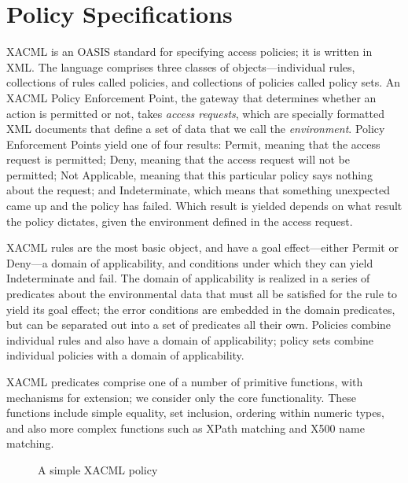 \section{Policy Specifications}
\label{sec:policy-spec}

XACML is an OASIS standard for specifying access policies; it is
written in XML.  The language comprises three classes of
objects---individual rules, collections of rules called policies, and
collections of policies called policy sets.  An XACML Policy
Enforcement Point, the gateway that determines whether an action is
permitted or not, takes \emph{access requests}, which are specially
formatted XML documents that define a set of data that we call the
\emph{environment}.  Policy Enforcement Points yield one of four
results: Permit, meaning that the access request is permitted; Deny,
meaning that the access request will not be permitted; Not Applicable,
meaning that this particular policy says nothing about the request;
and Indeterminate, which means that something unexpected came up and
the policy has failed.  Which result is yielded depends on what result
the policy dictates, given the environment defined in the access
request.

XACML rules are the most basic object, and have a goal effect---either
Permit or Deny---a domain of applicability, and conditions under which
they can yield Indeterminate and fail.  The domain of applicability is
realized in a series of predicates about the environmental data that
must all be satisfied for the rule to yield its goal effect; the error
conditions are embedded in the domain predicates, but can be separated
out into a set of predicates all their own.  Policies combine
individual rules and also have a domain of applicability; policy sets
combine individual policies with a domain of applicability.

XACML predicates comprise one of a number of primitive functions, with
mechanisms for extension; we consider only the core functionality.
These functions include simple equality, set inclusion, ordering
within numeric types, and also more complex functions such as XPath
matching and X500 name matching.

\begin{figure}[t]
\centering
\begin{scriptsize}
 
\end{scriptsize}
\caption{A simple XACML policy}
\label{fig:example}
\end{figure}

